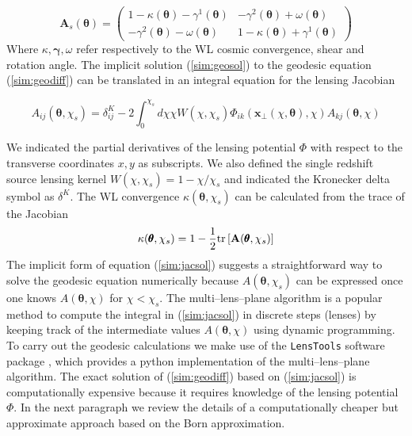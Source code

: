 \documentclass[reprint,aps,prd,superscriptaddress,showkeys,showpacs]{revtex4-1}
\newcommand{\bb}[1]{\mathbf{#1}}
\newcommand{\ttt}[1]{\texttt{#1}}
\newcommand\pt{\pmb{\theta}}
\begin{document}
\begin{equation}
\bb{A}_s(\pt) = 
\begin{pmatrix}
1-\kappa(\pt)-\gamma^1(\pt) & -\gamma^2(\pt) + \omega(\pt) \\
-\gamma^2(\pt) - \omega(\pt) & 1-\kappa(\pt)+\gamma^1(\pt)
\end{pmatrix}
\end{equation}
%
Where $\kappa,\pmb{\gamma},\omega$ refer respectively to the WL cosmic convergence, shear and rotation angle. The implicit solution (\ref{sim:geosol}) to the geodesic equation (\ref{sim:geodiff}) can be translated in an integral equation for the lensing Jacobian

\begin{widetext}
\begin{equation}
\label{sim:jacsol}
A_{ij}(\pt,\chi_s) = \delta^K_{ij}-2\int_0^{\chi_s} d\chi\chi W(\chi,\chi_s)\Phi_{ik}(\bb{x}_\perp(\chi,\pt),\chi)A_{kj}(\pt,\chi)
\end{equation} 
\end{widetext}
%
We indicated the partial derivatives of the lensing potential $\Phi$ with respect to the transverse coordinates $x,y$ as subscripts. We also defined the single redshift source lensing kernel $W(\chi,\chi_s)=1-\chi/\chi_s$ and indicated the Kronecker delta symbol as $\delta^K$. The WL convergence $\kappa(\pt,\chi_s)$ can be calculated from the trace of the Jacobian
\begin{equation}
\label{sim:trkappa}
\kappa(\pt,\chi_s) = 1-\frac{1}{2}{\rm tr}\left[\bb{A}(\pt,\chi_s)\right]
\end{equation}
%
The implicit form of equation (\ref{sim:jacsol}) suggests a straightforward way to solve the geodesic equation numerically because $A(\pt,\chi_s)$ can be expressed once one knows $A(\pt,\chi)$ for $\chi<\chi_s$. The multi--lens--plane algorithm \citep{RayTracingJain,RayTracingHartlap} is a popular method to compute the integral in (\ref{sim:jacsol}) in discrete steps (lenses) by keeping track of the intermediate values $A(\pt,\chi)$ using dynamic programming. To carry out the geodesic calculations we make use of the \ttt{LensTools} software package \citep{LensTools-paper}, which provides a {\sc python} implementation of the multi--lens--plane algorithm. The exact solution of (\ref{sim:geodiff}) based on (\ref{sim:jacsol}) is computationally expensive because it requires knowledge of the lensing potential $\Phi$. In the next paragraph we review the details of a computationally cheaper but approximate approach based on the Born approximation.     
\end{document}
